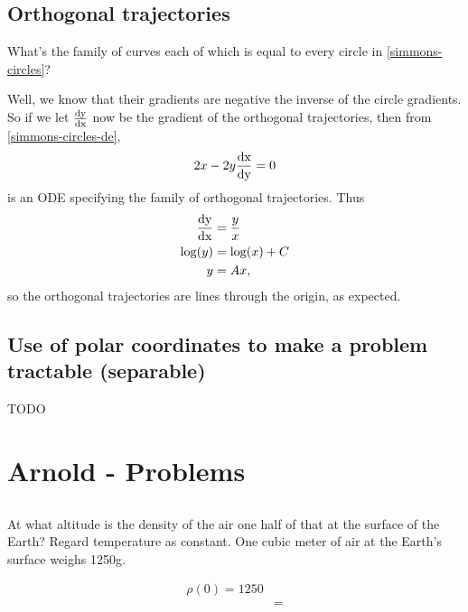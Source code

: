 \subsection{Orthogonal trajectories}
What's the family of curves each of which is equal to every circle in \eqref{simmons-circles}?

Well, we know that their gradients are negative the inverse of the circle
gradients. So if we let $\frac{\operatorname{\text{dy}}}{\operatorname{\text{dx}}}$ now be the gradient of the orthogonal
trajectories, then from \eqref{simmons-circles-de},
\begin{align*}
  2x - 2y\frac{\operatorname{\text{dx}}}{\operatorname{\text{dy}}} = 0
\end{align*}
is an ODE specifying the family of orthogonal trajectories. Thus
\begin{align*}
  \frac{\operatorname{\text{dy}}}{\operatorname{\text{dx}}} &= \frac{y}{x}\\
  \log(y) &= \log(x) + C\\
       y &= Ax,
\end{align*}
so the orthogonal trajectories are lines through the origin, as expected.

\subsection{Use of polar coordinates to make a problem tractable (separable)}
TODO

\section{Arnold - Problems}
\subsection{}
\begin{mdframed}
  At what altitude is the density of the air one half of that at the surface of
  the Earth? Regard temperature as constant. One cubic meter of air at the
  Earth's surface weighs 1250g.
\end{mdframed}
\begin{align*}
  \rho(0) = 1250\\
  &=
\end{align*}